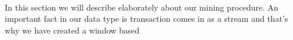 \documentclass{article}
\begin{document}
\paragraph*{}
In this section we will describe elaborately about our mining procedure. An important fact in our data type is transaction comes in as a stream and that's why we have created a window based 
\end{document}
